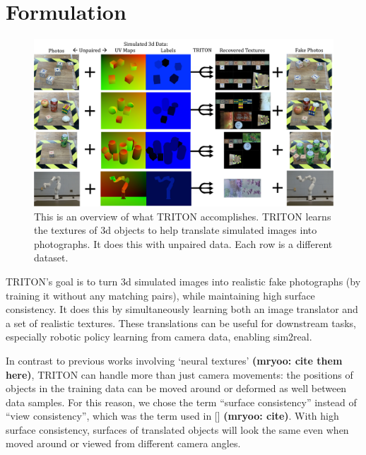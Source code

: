 \documentclass{article}
\begin{document}
\section{Formulation}
\label{sec:data}
	\begin{figure}[thbp]
	\vspace{-10pt}
		\begin{center}
			\includegraphics[width=\textwidth]{../images/first_diagram.pdf}
		\end{center}
		\vspace{-5pt}
		\caption{
			This is an overview of what TRITON accomplishes.
			TRITON learns the textures of 3d objects to help translate simulated images into photographs. It does this with unpaired data. Each row is a different dataset.
			}
		\label{fig:first_diagram}
	\end{figure}

	TRITON's goal is to turn 3d simulated images into realistic fake photographs (by training it without any matching pairs), while maintaining high surface consistency.
	It does this by simultaneously learning both an image translator and a set of realistic textures.
	These translations can be useful for downstream tasks, especially robotic policy learning from camera data, enabling sim2real.
	
	In contrast to previous works involving `neural textures' \textbf{(mryoo: cite them here)}, TRITON can handle more than just camera movements:
	the positions of objects in the training data can be moved around or deformed as well between data samples.
	For this reason, we chose the term ``surface consistency'' instead of ``view consistency'', which was the term used in [] \textbf{(mryoo: cite)}.
	With high surface consistency, surfaces of translated objects will look the same even when moved around or viewed from different camera angles.
\end{document}
